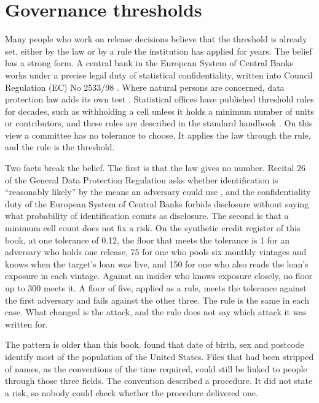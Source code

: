 \chapter{Governance thresholds}\label{ch:thresholds}

Many people who work on release decisions believe that the threshold is already
set, either by the law or by a rule the institution has applied for years. The
belief has a strong form. A central bank in the European System of Central Banks
works under a precise legal duty of statistical confidentiality, written into
Council Regulation (EC) No 2533/98 \citep{ec2533,ec951}. Where natural persons are
concerned, data protection law adds its own test \citep{gdpr2016}. Statistical
offices have published threshold rules for decades, such as withholding a cell
unless it holds a minimum number of units or contributors, and these rules are
described in the standard handbook \citep[ch.~4]{hundepool2012}. On this view a
committee has no tolerance to choose. It applies the law through the rule, and the
rule is the threshold.

Two facts break the belief. The first is that the law gives no number. Recital 26
of the General Data Protection Regulation asks whether identification is
``reasonably likely'' by the means an adversary could use \citep{gdpr2016}, and
the confidentiality duty of the European System of Central Banks forbids disclosure
without saying what probability of identification counts as disclosure. The second
is that a minimum cell count does not fix a risk. On the synthetic credit register
of this book, at one tolerance of 0.12, the floor that meets the tolerance is 1 for
an adversary who holds one release, 75 for one who pools six monthly vintages and
knows when the target's loan was live, and 150 for one who also reads the loan's
exposure in each vintage. Against an insider who knows exposure closely, no floor up
to 300 meets it.
A floor of five, applied as a rule, meets the tolerance against the first adversary
and fails against the other three. The rule is the same in each case. What changed
is the attack, and the rule does not say which attack it was written for.

The pattern is older than this book. \citet{sweeney2000} found that date of birth,
sex and postcode identify most of the population of the United States. Files that
had been stripped of names, as the conventions of the time required, could still
be linked to people through those three fields. The convention described a
procedure. It did not state a risk, so nobody could check whether the procedure
delivered one.

